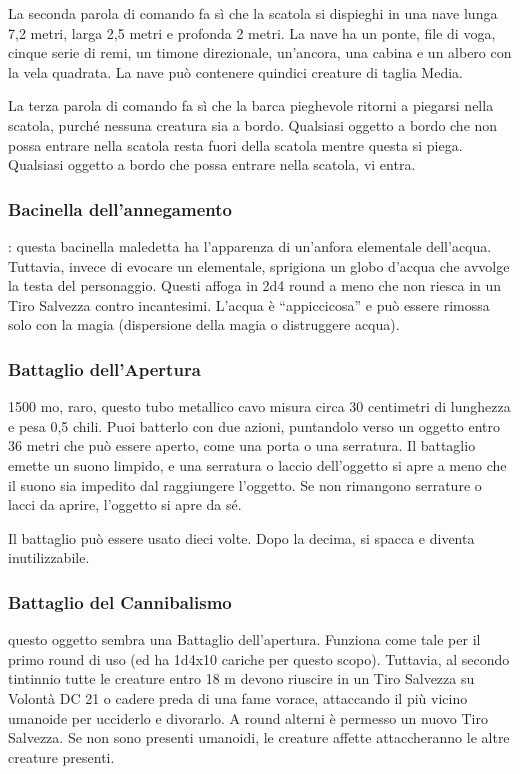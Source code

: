 \begin{multicols}{2}
	La seconda parola di comando fa sì che la scatola si dispieghi in una nave lunga 7,2 metri, larga 2,5 metri e profonda 2 metri. La nave ha un ponte, file di voga, cinque serie di remi, un timone direzionale, un'ancora, una cabina e un albero con la vela quadrata. La nave può contenere quindici creature di taglia Media.

	La terza parola di comando fa sì che la barca pieghevole ritorni a piegarsi nella scatola, purché nessuna creatura sia a bordo. Qualsiasi oggetto a bordo che non possa entrare nella scatola resta fuori della scatola mentre questa si piega. Qualsiasi oggetto a bordo che possa entrare nella scatola, vi entra.

	\subsubsection*{Bacinella dell’annegamento}: questa bacinella maledetta ha l'apparenza di un'anfora elementale dell'acqua. Tuttavia, invece di evocare un elementale, sprigiona un globo d’acqua che avvolge la testa del personaggio. Questi affoga in 2d4 round a meno che non riesca in un Tiro Salvezza contro incantesimi. L'acqua è “appiccicosa” e può essere rimossa solo con la magia (dispersione della magia o distruggere acqua).

	\subsubsection*{Battaglio dell'Apertura}
	1500 mo, raro, questo tubo metallico cavo misura circa 30 centimetri di lunghezza e pesa 0,5 chili. Puoi batterlo con due azioni, puntandolo verso un oggetto entro 36 metri che può essere aperto, come una porta o una serratura. Il battaglio emette un suono limpido, e una serratura o laccio dell'oggetto si apre a meno che il suono sia impedito dal raggiungere l'oggetto. Se non rimangono serrature o lacci da aprire, l'oggetto si apre da sé.

	Il battaglio può essere usato dieci volte. Dopo la decima, si spacca e diventa inutilizzabile.

	\subsubsection*{Battaglio del Cannibalismo}
	questo oggetto sembra una Battaglio dell'apertura. Funziona come tale per il primo round di uso (ed ha 1d4x10 cariche per questo scopo). Tuttavia, al secondo tintinnio tutte le creature entro 18 m devono riuscire in un Tiro Salvezza su Volontà DC 21 o cadere preda di una fame vorace, attaccando il più vicino umanoide per ucciderlo e divorarlo. A round alterni è permesso un nuovo Tiro Salvezza. Se non sono presenti umanoidi, le creature affette attaccheranno le altre creature presenti.


\end{multicols}
